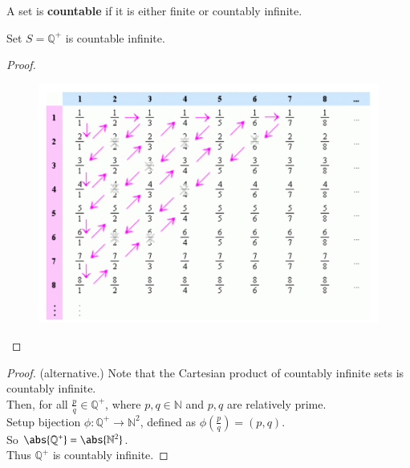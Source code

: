 \documentclass[11pt]{article}
\begin{document}
		\begin{definition}
			A set is \textbf{countable} if it is either finite or countably infinite.
		\end{definition}
		
		\begin{theorem}
			Set $S = \mathbb{Q}^+$ is countable infinite.
		\end{theorem}
		\begin{proof}
			\begin{figure}[h]
				\centering
				\includegraphics[width=0.5\linewidth]{figures/countinfproof}
			\end{figure}
		\end{proof}
		\begin{proof}(alternative.)
			Note that the Cartesian product of countably infinite sets is countably infinite. \\
			Then, for all $\frac{p}{q} \in \mathbb{Q}^+$, where $p, q \in \mathbb{N}$ and $p, q$ are relatively prime. \\
			Setup bijection $\phi:\mathbb{Q}^+ \to \mathbb{N}^2$, defined as $\phi(\frac{p}{q}) = (p,q)$. \\
			So $\abs{\mathbb{Q}^+} = \abs{\mathbb{N}^2}$. \\
			Thus $\mathbb{Q}^+$ is countably infinite.
		\end{proof}
		
\end{document}
